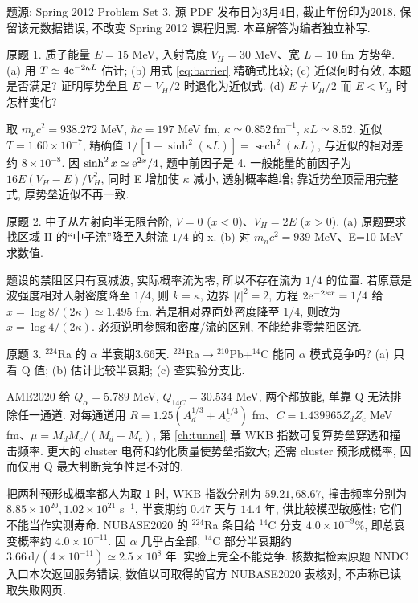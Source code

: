 题源: Spring 2012 Problem Set 3. 源 PDF 发布日为3月4日, 截止年份印为2018, 保留该元数据错误, 不改变 Spring 2012 课程归属. 本章解答为编者独立补写.
\begin{exercise}\label{ex:2202-3-1}
原题 1. 质子能量 $E=15$ MeV, 入射高度 $V_H=30$ MeV、宽 $L=10$ fm 方势垒. (a) 用 $T\simeq4\mathrm e^{-2\kappa L}$ 估计; (b) 用式 \eqref{eq:barrier} 精确式比较; (c) 近似何时有效, 本题是否满足? 证明厚势垒且 $E=V_H/2$ 时退化为近似式. (d) $E\ne V_H/2$ 而 $E<V_H$ 时怎样变化?
\end{exercise}
\begin{solution}
取 $m_pc^2=938.272$ MeV, $\hbar c=197$ MeV fm, $\kappa\simeq0.852\,\mathrm{fm}^{-1}$, $\kappa L\simeq8.52$. 近似 $T=1.60\times10^{-7}$, 精确值 $1/[1+\sinh^2(\kappa L)]=\operatorname{sech}^2(\kappa L)$, 与近似的相对差约 $8\times10^{-8}$. 因 $\sinh^2x\simeq\mathrm e^{2x}/4$, 题中前因子是 4. 一般能量的前因子为 $16E(V_H-E)/V_H^2$, 同时 E 增加使 $\kappa$ 减小, 透射概率趋增; 靠近势垒顶需用完整式, 厚势垒近似不再一致.
\end{solution}
\begin{exercise}\label{ex:2202-3-2}
原题 2. 中子从左射向半无限台阶, $V=0$ ($x<0$)、$V_H=2E$ ($x>0$). (a) 原题要求找区域 II 的``中子流''降至入射流 $1/4$ 的 x. (b) 对 $m_nc^2=939$ MeV、E=10 MeV 求数值.
\end{exercise}
\begin{solution}
题设的禁阻区只有衰减波, 实际概率流为零, 所以不存在流为 $1/4$ 的位置. 若原意是波强度相对入射密度降至 $1/4$, 则 $k=\kappa$, 边界 $|t|^2=2$, 方程 $2\mathrm e^{-2\kappa x}=1/4$ 给 $x=\log8/(2\kappa)\simeq1.495$ fm. 若是相对界面处密度降至 $1/4$, 则改为 $x=\log4/(2\kappa)$. 必须说明参照和密度/流的区别, 不能给非零禁阻区流.
\end{solution}
\begin{exercise}\label{ex:2202-3-3}
原题 3. ${}^{224}$Ra 的 $\alpha$ 半衰期3.66天. ${}^{224}$Ra$\to{}^{210}$Pb+$^{14}$C 能同 $\alpha$ 模式竞争吗? (a) 只看 Q 值; (b) 估计比较半衰期; (c) 查实验分支比.
\end{exercise}
\begin{solution}
AME2020 给 $Q_\alpha=5.789$ MeV, $Q_{14C}=30.534$ MeV, 两个都放能, 单靠 Q 无法排除任一通道. 对每通道用 $R=1.25(A_d^{1/3}+A_c^{1/3})$ fm、$C=1.439965Z_dZ_c$ MeV fm、$\mu=M_dM_c/(M_d+M_c)$, 第 \ref{ch:tunnel} 章 WKB 指数可复算势垒穿透和撞击频率. 更大的 cluster 电荷和约化质量使势垒指数大; 还需 cluster 预形成概率, 因而仅用 Q 最大判断竞争性是不对的.

把两种预形成概率都人为取 1 时, WKB 指数分别为 $59.21,68.67$, 撞击频率分别为 $8.85\times10^{20},1.02\times10^{21}$ s$^{-1}$, 半衰期约 $0.47$ 天与 $14.4$ 年, 供比较模型敏感性; 它们不能当作实测寿命. NUBASE2020 的 $^{224}$Ra 条目给 $^{14}$C 分支 $4.0\times10^{-9}\%$, 即总衰变概率约 $4.0\times10^{-11}$. 因 $\alpha$ 几乎占全部, $^{14}$C 部分半衰期约 $3.66\,\mathrm d/(4\times10^{-11})\simeq2.5\times10^8$ 年. 实验上完全不能竞争. 核数据检索原题 NNDC 入口本次返回服务错误, 数值以可取得的官方 NUBASE2020 表核对, 不声称已读取失败网页.
\end{solution}

